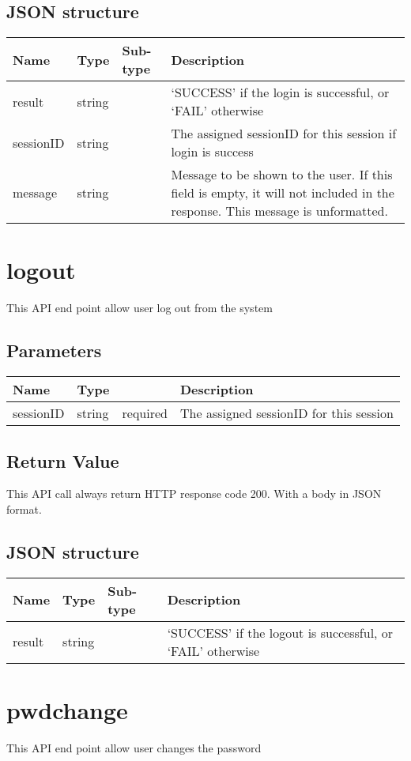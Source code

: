 \documentclass[a4paper,12pt]{report}
\begin{document}
	\subsection{JSON structure}
	\begin{tabular}{|l|l|l|p{10cm}|}
		\hline
		Name & Type & Sub-type & Description\\\hline
		result & string & & 	`SUCCESS' if the login is successful, or\newline
									`FAIL' otherwise\\\hline
		sessionID & string & & The assigned sessionID for this session if login is success\\\hline
		message & string & & Message to be shown to the user. If this field is empty, it will not included in the response. This message is unformatted.\\\hline
	\end{tabular}
	\section{logout}
	This API end point allow user log out from the system
	\subsection{Parameters}
	\begin{tabular}{|l|ll|p{10cm}|}
		\hline
		Name & Type & & Description\\\hline
		sessionID & string & required & The assigned sessionID for this session\\\hline
	\end{tabular}
	\subsection{Return Value}
	This API call always return HTTP response code 200. With a body in JSON format.
	\subsection{JSON structure}
	\begin{tabular}{|l|l|l|p{10cm}|}
		\hline
		Name & Type & Sub-type & Description\\\hline
		result & string &  & 	`SUCCESS' if the logout is successful, or\newline
		`FAIL' otherwise\\\hline
	\end{tabular}
	\section{pwdchange}
	This API end point allow user changes the password
\end{document}

